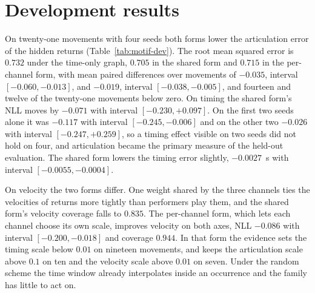 \documentclass[11pt,a4paper]{report}
\begin{document}
\section{Development results}\label{sec:motif-dev}
On twenty-one movements with four seeds both forms lower the articulation
error of the hidden returns (Table~\ref{tab:motif-dev}). The root mean
squared error is $0.732$ under the time-only graph, $0.705$ in the shared
form and $0.715$ in the per-channel form, with mean paired differences over
movements of $-0.035$, interval $[-0.060, -0.013]$, and $-0.019$, interval
$[-0.038, -0.005]$, and fourteen and twelve of the twenty-one movements
below zero. On timing the shared form's NLL moves by $-0.071$ with
interval $[-0.230, +0.097]$. On the first two seeds alone it was $-0.117$
with interval $[-0.245, -0.006]$ and on the other two $-0.026$ with interval
$[-0.247, +0.259]$, so a timing effect visible on two seeds did not hold on
four, and articulation became the primary measure of the held-out
evaluation. The shared form lowers the timing error slightly, $-0.0027$~s
with interval $[-0.0055, -0.0004]$.

On velocity the two forms differ. One weight shared by the three channels
ties the velocities of returns more tightly than performers play them, and
the shared form's velocity coverage falls to $0.835$. The per-channel form,
which lets each channel choose its own scale, improves velocity on both
axes, NLL $-0.086$ with interval $[-0.200, -0.018]$ and coverage
$0.944$. In that form the evidence sets the timing scale below $0.01$ on
nineteen movements, and keeps the articulation scale above $0.1$ on ten and
the velocity scale above $0.01$ on seven. Under the random scheme the time
window already interpolates inside an occurrence and the family has little
to act on.
\end{document}

